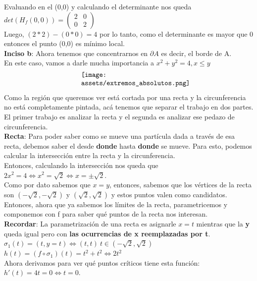 \documentclass[10pt,a4paper]{article}
\begin{document}
Evaluando en el (0,0) y calculando el determinante nos queda 
$det(H_{f}(0,0)) = \begin{pmatrix}
    2 & 0 \\
    0 & 2 
\end{pmatrix}$ \\
Luego, $(2 * 2) - (0 * 0) = 4$ por lo tanto, como el determinante es mayor que 0 entonces el punto (0,0) es mínimo local. \\
\textbf{Inciso b}: Ahora tenemos que concentrarnos en $\partial A$ es decir, el borde de A. \\
En este caso, vamos a darle mucha importancia a $x^{2} + y^{2} = 4, x \le y$
\[\begin{minipage}[b]{0.4\textwidth}
    \texttt{[image: assets/extremos\_absolutos.png]}
\end{minipage}\]
Como la región que queremos ver está cortada por una recta y la circunferencia no está completamente pintada, acá tenemos que separar el trabajo en dos partes. \\
El primer trabajo es analizar la recta y el segunda es analizar ese pedazo de circunferencia. \\
\textbf{Recta}: Para poder saber como se mueve una partícula dada a través de esa recta, debemos saber el desde \textbf{donde} hasta \textbf{donde} se mueve. Para esto, podemos calcular la intersección entre la recta y la circunferencia. \\
Entonces, calculando la intersección nos queda que $2x^{2} = 4 \iff x^{2} = \sqrt{2} \iff x = \pm \sqrt{2}$. \\
Como por dato sabemos que $x=y$, entonces, sabemos que los vértices de la recta son $(-\sqrt{2}, -\sqrt{2})$ y $(\sqrt{2}, \sqrt{2})$ y estos puntos valen como candidatos.\\
Entonces, ahora que ya sabemos los límites de la recta, parametricemos y componemos con f para saber qué puntos de la recta nos interesan. \\
\textbf{Recordar}: La parametrización de una recta es asignarle $ x = t$ mientras que la \textbf{y} queda igual pero con \textbf{las ocurrencias de x reemplazadas por t}. \\
$\sigma_{1}(t) = (t, y = t) \iff (t, t) \ t \in (-\sqrt{2}, \sqrt{2})$ \\
$h(t) = (f \circ \sigma_{1})(t) = t^{2} + t^{2} \iff 2t^{2}$ \\
Ahora derivamos para ver qué puntos críticos tiene esta función: $h'(t) = 4t = 0 \iff t = 0$. \\
\end{document}
